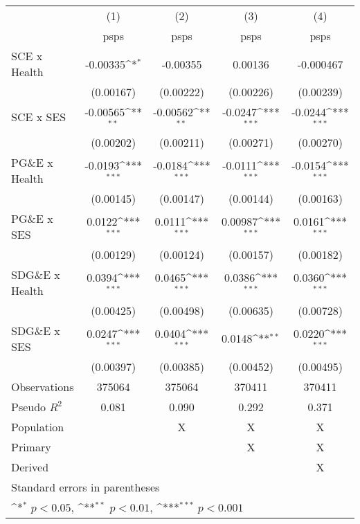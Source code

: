 {
\def\sym#1{\ifmmode^{#1}\else\(^{#1}\)\fi}
\begin{tabular}{l*{4}{c}}
\hline\hline
                    &\multicolumn{1}{c}{(1)}         &\multicolumn{1}{c}{(2)}         &\multicolumn{1}{c}{(3)}         &\multicolumn{1}{c}{(4)}         \\
                    &        psps         &        psps         &        psps         &        psps         \\
\hline
SCE x Health        &    -0.00335\sym{*}  &    -0.00355         &     0.00136         &   -0.000467         \\
                    &   (0.00167)         &   (0.00222)         &   (0.00226)         &   (0.00239)         \\
[1em]
SCE x SES           &    -0.00565\sym{**} &    -0.00562\sym{**} &     -0.0247\sym{***}&     -0.0244\sym{***}\\
                    &   (0.00202)         &   (0.00211)         &   (0.00271)         &   (0.00270)         \\
[1em]
PG\&E x Health      &     -0.0193\sym{***}&     -0.0184\sym{***}&     -0.0111\sym{***}&     -0.0154\sym{***}\\
                    &   (0.00145)         &   (0.00147)         &   (0.00144)         &   (0.00163)         \\
[1em]
PG\&E x SES         &      0.0122\sym{***}&      0.0111\sym{***}&     0.00987\sym{***}&      0.0161\sym{***}\\
                    &   (0.00129)         &   (0.00124)         &   (0.00157)         &   (0.00182)         \\
[1em]
SDG\&E x Health     &      0.0394\sym{***}&      0.0465\sym{***}&      0.0386\sym{***}&      0.0360\sym{***}\\
                    &   (0.00425)         &   (0.00498)         &   (0.00635)         &   (0.00728)         \\
[1em]
SDG\&E x SES        &      0.0247\sym{***}&      0.0404\sym{***}&      0.0148\sym{**} &      0.0220\sym{***}\\
                    &   (0.00397)         &   (0.00385)         &   (0.00452)         &   (0.00495)         \\
\hline
Observations        &      375064         &      375064         &      370411         &      370411         \\
Pseudo \(R^{2}\)    &       0.081         &       0.090         &       0.292         &       0.371         \\
Population          &                     &           X         &           X         &           X         \\
Primary             &                     &                     &           X         &           X         \\
Derived             &                     &                     &                     &           X         \\
\hline\hline
\multicolumn{5}{l}{\footnotesize Standard errors in parentheses}\\
\multicolumn{5}{l}{\footnotesize \sym{*} \(p<0.05\), \sym{**} \(p<0.01\), \sym{***} \(p<0.001\)}\\
\end{tabular}
}
